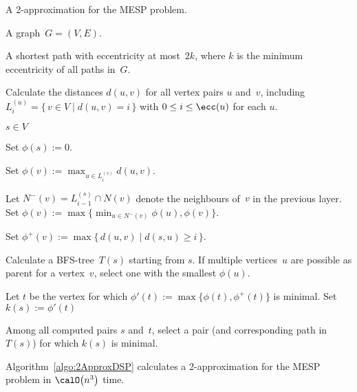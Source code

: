 \begin{algorithm}
    [htb]
    \caption
    {
        A 2-approximation for the MESP problem.
    }
    \label{algo:2ApproxDSP}

\KwIn
{%
    A graph~$G = (V, E)$.
}

\KwOut
{%
    A shortest path with eccentricity at most~$2k$, where $k$ is the minimum eccentricity of all paths in~$G$.
}

Calculate the distances $d(u,v)$ for all vertex pairs $u$ and~$v$, including $L_i^{(u)}=\{ \, v \in V \mid d(u,v) = i \, \}$ with $0 \leq i \leq \ecc(u)$ for each $u$.
\label{line:Distances}

\ForEach
{%
    $s \in V$
    \label{line:forLoop}
}
{%
    Set $\phi(s) := 0$.

    {
        \label{line:LayerLoop}

        {
            \label{line:VertexInLayerLoop}

            Set $\phi(v) := \max_{u \in L_i^{(s)}}d(u,v)$.
            \label{line:LayerDistance}

            Let $N^-(v) = L_{i-1}^{(s)}\cap N(v)$ denote the neighbours of~$v$ in the previous layer.
            Set $\phi(v) := \max \Big \{ \! \min_{u \in N^-(v)}\phi(u), \phi(v) \Big \}$.
            \label{line:prevLayerDistance}

            Set $\phi^+(v) := \max \big \{ \, d(u,v) \mid d(s,u) \geq i \, \big \}$.
            \label{line:laterLayerDistance}
        }
    }

    Calculate a BFS-tree~$T(s)$ starting from $s$.
    If multiple vertices~$u$ are possible as parent for a vertex~$v$, select one with the smallest $\phi(u)$.
    \label{line:BFSTree}


    Let $t$ be the vertex for which $\phi'(t) := \max \big \{ \phi(t), \phi^+(t) \big \}$ is minimal.
    Set $k(s) := \phi'(t)$
    \label{line:SelectMinT}

}

Among all computed pairs $s$ and~$t$, select a pair (and corresponding path in~$T(s)$) for which $k(s)$ is minimal.
\label{line:SelectMinK}

\end{algorithm}

\begin{theorem}
Algorithm~\ref{algo:2ApproxDSP} calculates a 2-approximation for the MESP problem in \( \calO \big( n^3 \big) \) time.
\end{theorem}

